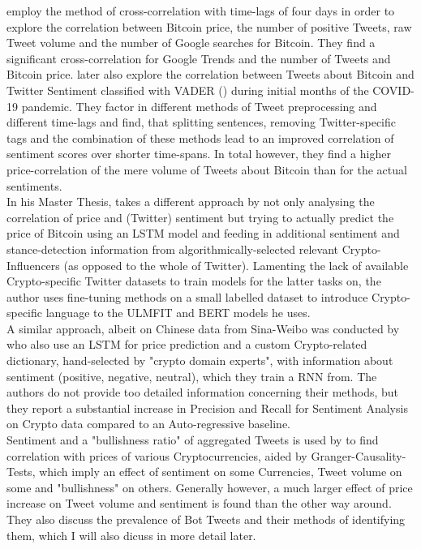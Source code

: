 \documentclass[11pt]{article}
\begin{document}
\citet{matta2015bitcoin} employ the method of cross-correlation with time-lags of four days in order to explore the correlation between Bitcoin price, the number of positive Tweets, raw Tweet volume and the number of Google searches for Bitcoin. They find a significant cross-correlation for Google Trends and the number of Tweets and Bitcoin price.
\citet{btccovid19} later also explore the correlation between Tweets about Bitcoin and Twitter Sentiment classified with VADER (\citet{vader}) during initial months of the COVID-19 pandemic. They factor in different methods of Tweet preprocessing and different time-lags and  find, that splitting sentences, removing Twitter-specific tags and the combination of these methods lead to an improved correlation of sentiment scores over shorter time-spans. In total however, they find a higher price-correlation of the mere volume of Tweets about Bitcoin than for the actual sentiments. \\
In his Master Thesis, \citet{btcpredictmaster21} takes a different approach by not only analysing the correlation of price and (Twitter) sentiment but trying to actually predict the price of Bitcoin using an LSTM model and feeding in additional sentiment and stance-detection information from algorithmically-selected relevant Crypto-Influencers (as opposed to the whole of Twitter). Lamenting the lack of available Crypto-specific Twitter datasets to train models for the latter tasks on, the author uses fine-tuning methods on a small labelled dataset to introduce Crypto-specific language to the ULMFIT and BERT models he uses. \\
A similar approach, albeit on Chinese data from Sina-Weibo was conducted by \citet{lstmsinaweibo2021} who also use an LSTM for price prediction and a custom Crypto-related dictionary, hand-selected by "crypto domain experts", with information about sentiment (positive, negative, neutral), which they train a RNN from. The authors do not provide too detailed information concerning their methods, but they report a substantial increase in Precision and Recall for Sentiment Analysis on Crypto data compared to an Auto-regressive baseline. \\
Sentiment and a  "bullishness ratio" of aggregated Tweets is used by \citet{KRAAIJEVELD2020101188} to find correlation with prices of various Cryptocurrencies, aided by Granger-Causality-Tests, which imply an effect of sentiment on some Currencies, Tweet volume on some and "bullishness" on others. Generally however, a much larger effect of price increase on Tweet volume and sentiment is found than the other way around. They also discuss the prevalence of Bot Tweets and their methods of identifying them, which I will also dicuss in more detail later. \\
\end{document}
